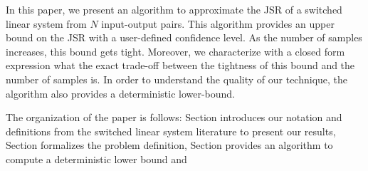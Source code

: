 In this paper, we present an algorithm to approximate the JSR of a switched linear system from $N$ input-output pairs. This algorithm provides an upper bound on the JSR with a user-defined confidence level. As the number of samples increases, this bound gets tight. Moreover, we characterize with a closed form expression what the exact trade-off between the tightness of this bound and the number of samples is. In order to understand the quality of our technique, the algorithm also provides a deterministic lower-bound.

The organization of the paper is follows: Section \label{preliminaries} introduces our notation and definitions from the switched linear system literature to present our results, Section \label{problemDefinition} formalizes the problem definition, Section \label{upperBound} provides an algorithm to compute a deterministic lower bound and 
%
%





